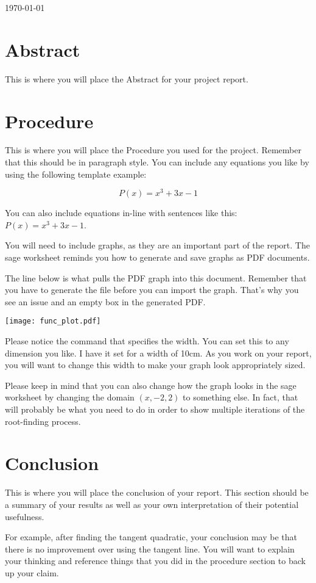 \documentclass[11pt]{article}
\begin{document}
\today

\begin{report}
\section*{Abstract}
This is where you will place the Abstract for your project report.

\section*{Procedure}
This is where you will place the Procedure you used for the project. Remember that this should be in paragraph style. You can include any equations you like by using the following template example:

\[
    P(x) = x^3 + 3x - 1
\]

You can also include equations in-line with sentences like this: $P(x)=x^3+3x-1$.

You will need to include graphs, as they are an important part of the report. The sage worksheet reminds you how to generate and save graphs as PDF documents.

The line below is what pulls the PDF graph into this document. Remember that you have to generate the file before you can import the graph. That's why you see an issue and an empty box in the generated PDF.

\texttt{[image: func\_plot.pdf]}

Please notice the command that specifies the width. You can set this to any dimension you like. I have it set for a width of 10cm. As you work on your report, you will want to change this width to make your graph look appropriately sized.

Please keep in mind that you can also change how the graph looks in the sage worksheet by changing the domain $(x,-2,2)$ to something else. In fact, that will probably be what you need to do in order to show multiple iterations of the root-finding process.

\section*{Conclusion}
This is where you will place the conclusion of your report. This section should be a summary of your results as well as your own interpretation of their potential usefulness.

For example, after finding the tangent quadratic, your conclusion may be that there is no improvement over using the tangent line. You will want to explain your thinking and reference things that you did in the procedure section to back up your claim.

\end{report}
\end{document}
